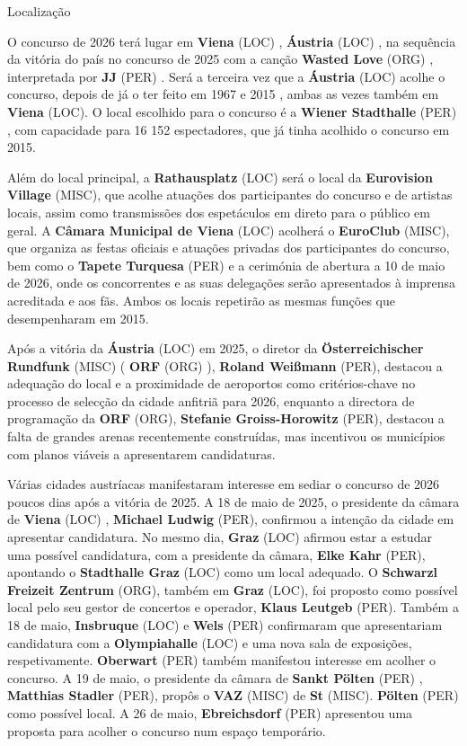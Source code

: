 \documentclass[12pt,a4paper]{article}
\begin{document}
Localização

O concurso de 2026 terá lugar em \textbf{Viena} (LOC) , \textbf{Áustria} (LOC) , na sequência da vitória do país no concurso de 2025 com a canção  \textbf{Wasted Love} (ORG) , interpretada por \textbf{JJ} (PER) . Será a terceira vez que a \textbf{Áustria} (LOC) acolhe o concurso, depois de já o ter feito em 1967 e 2015 , ambas as vezes também em \textbf{Viena} (LOC). O local escolhido para o concurso é a \textbf{Wiener Stadthalle} (PER) , com capacidade para 16 152 espectadores, que já tinha acolhido o concurso em 2015.

Além do local principal, a \textbf{Rathausplatz} (LOC) será o local da \textbf{Eurovision Village} (MISC), que acolhe atuações dos participantes do concurso e de artistas locais, assim como transmissões dos espetáculos em direto para o público em geral. A \textbf{Câmara Municipal de Viena} (LOC) acolherá o \textbf{EuroClub} (MISC), que organiza as festas oficiais e atuações privadas dos participantes do concurso, bem como o \textbf{Tapete Turquesa} (PER) e a cerimónia de abertura a 10 de maio de 2026, onde os concorrentes e as suas delegações serão apresentados à imprensa acreditada e aos fãs. Ambos os locais repetirão as mesmas funções que desempenharam em 2015.

Após a vitória da \textbf{Áustria} (LOC) em 2025, o diretor da \textbf{Österreichischer Rundfunk} (MISC) ( \textbf{ORF} (ORG) ), \textbf{Roland Weißmann} (PER), destacou a adequação do local e a proximidade de aeroportos como critérios-chave no processo de selecção da cidade anfitriã para 2026, enquanto a directora de programação da \textbf{ORF} (ORG), \textbf{Stefanie Groiss-Horowitz} (PER), destacou a falta de grandes arenas recentemente construídas, mas incentivou os municípios com planos viáveis a apresentarem candidaturas.

Várias cidades austríacas manifestaram interesse em sediar o concurso de 2026 poucos dias após a vitória de 2025. A 18 de maio de 2025, o presidente da câmara de \textbf{Viena} (LOC) , \textbf{Michael Ludwig} (PER), confirmou a intenção da cidade em apresentar candidatura. No mesmo dia, \textbf{Graz} (LOC) afirmou estar a estudar uma possível candidatura, com a presidente da câmara, \textbf{Elke Kahr} (PER), apontando o \textbf{Stadthalle Graz} (LOC) como um local adequado. O \textbf{Schwarzl Freizeit Zentrum} (ORG), também em \textbf{Graz} (LOC), foi proposto como possível local pelo seu gestor de concertos e operador, \textbf{Klaus Leutgeb} (PER). Também a 18 de maio, \textbf{Insbruque} (LOC) e \textbf{Wels} (PER) confirmaram que apresentariam candidatura com a \textbf{Olympiahalle} (LOC) e uma nova sala de exposições, respetivamente. \textbf{Oberwart} (PER) também manifestou interesse em acolher o concurso. A 19 de maio, o presidente da câmara de \textbf{Sankt Pölten} (PER) , \textbf{Matthias Stadler} (PER), propôs o \textbf{VAZ} (MISC) de \textbf{St} (MISC). \textbf{Pölten} (PER) como possível local. A 26 de maio, \textbf{Ebreichsdorf} (PER) apresentou uma proposta para acolher o concurso num espaço temporário.
\end{document}
